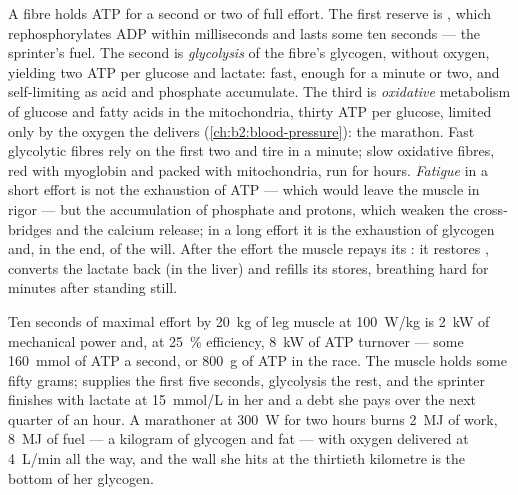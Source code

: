 \begin{proposition}\label{prop:b2:muscle-movement:energy}
A fibre holds ATP for a second or two of full effort. The first
reserve is \emph{}, which rephosphorylates ADP
within milliseconds and lasts some ten seconds --- the sprinter's
fuel. The second is \emph{glycolysis} of the fibre's glycogen,
without oxygen, yielding two ATP per glucose and lactate: fast,
enough for a minute or two, and self-limiting as acid and phosphate
accumulate. The third is \emph{oxidative} metabolism of glucose and
fatty acids in the mitochondria, thirty ATP per glucose, limited
only by the oxygen the  delivers
(\cref{ch:b2:blood-pressure}): the marathon. Fast glycolytic fibres
rely on the first two and tire in a minute; slow oxidative fibres,
red with myoglobin and packed with mitochondria, run for hours.
\emph{Fatigue} in a short effort is not the exhaustion of ATP ---
which would leave the muscle in rigor --- but the accumulation of
phosphate and protons, which weaken the cross-bridges and the
calcium release; in a long effort it is the exhaustion of glycogen
and, in the end, of the will. After the effort the muscle repays
its \emph{}: it restores , converts
the lactate back (in the liver) and refills its stores, breathing
hard for minutes after standing still.
\end{proposition}

\begin{example}\label{ex:b2:muscle-movement:sprint}
Ten seconds of maximal effort by \qty{20}{kg} of leg muscle at
\qty{100}{W/kg} is \qty{2}{kW} of mechanical power and, at
\qty{25}{\%} efficiency, \qty{8}{kW} of ATP turnover --- some
\qty{160}{mmol} of ATP a second, or \qty{800}{g} of ATP in the race.
The muscle holds some fifty grams;  supplies the first
five seconds, glycolysis the rest, and the sprinter finishes with
lactate at \qty{15}{mmol/L} in her  and a debt she pays over
the next quarter of an hour. A marathoner at \qty{300}{W} for two
hours burns \qty{2}{MJ} of work, \qty{8}{MJ} of fuel --- a kilogram of
glycogen and fat --- with oxygen delivered at \qty{4}{L/min} all the
way, and the wall she hits at the thirtieth kilometre is the bottom
of her glycogen.
\end{example}

